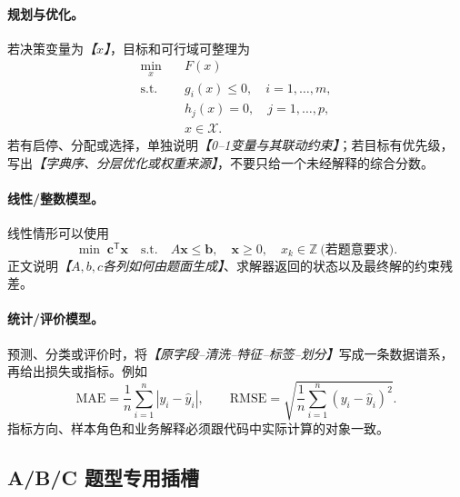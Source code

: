 \documentclass[UTF8,zihao=-4]{ctexart}
\newcommand{\slot}[1]{\textcolor{inkblue}{\textit{【#1】}}}
\begin{document}
\paragraph{规划与优化。}若决策变量为\slot{$x$}，目标和可行域可整理为
\begin{equation}
\begin{aligned}
\min_{x}\quad & F(x)\\
\text{s.t.}\quad & g_i(x)\leq 0,\quad i=1,\ldots,m,\\
& h_j(x)=0,\quad j=1,\ldots,p,\\
& x\in\mathcal{X}.
\end{aligned}
\end{equation}
若有启停、分配或选择，单独说明\slot{0--1变量与其联动约束}；若目标有优先级，写出\slot{字典序、分层优化或权重来源}，不要只给一个未经解释的综合分数。

\paragraph{线性/整数模型。}线性情形可以使用
\begin{equation}
\min\;\boldsymbol{c}^{\mathsf T}\boldsymbol{x}\quad
\text{s.t.}\quad A\boldsymbol{x}\leq\boldsymbol{b},\quad
\boldsymbol{x}\geq0,\quad x_k\in\mathbb{Z}\ \text{(若题意要求)}.
\end{equation}
正文说明\slot{$A,b,c$各列如何由题面生成}、求解器返回的状态以及最终解的约束残差。

\paragraph{统计/评价模型。}预测、分类或评价时，将\slot{原字段--清洗--特征--标签--划分}写成一条数据谱系，再给出损失或指标。例如
\begin{equation}
\mathrm{MAE}=\frac{1}{n}\sum_{i=1}^{n}|y_i-\hat y_i|,\qquad
\mathrm{RMSE}=\sqrt{\frac{1}{n}\sum_{i=1}^{n}(y_i-\hat y_i)^2}.
\end{equation}
指标方向、样本角色和业务解释必须跟代码中实际计算的对象一致。

\subsection{A/B/C 题型专用插槽}
\end{document}
